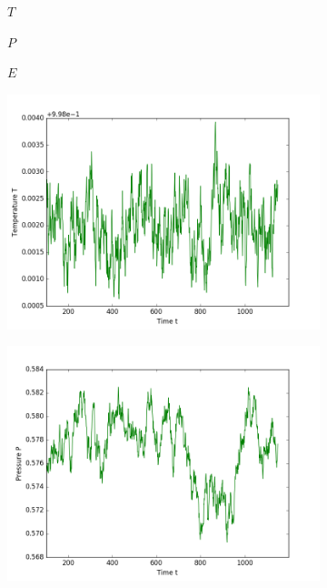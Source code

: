 \begin{figure}[ht]
\hfill
\begin{subfigure}{0.3\textwidth}
\centering
$T$
\end{subfigure}
\hfill
\begin{subfigure}{0.3\textwidth}
\centering
$P$
\end{subfigure}
\hfill
\begin{subfigure}{0.3\textwidth}
\centering
$E$
\end{subfigure}

\begin{subfigure}{0.3\textwidth}
\includegraphics[width=\textwidth]{fig/avTemperature_T1d0_F20d0_M100.png}
\end{subfigure}
\hfill
\begin{subfigure}{0.3\textwidth}
\includegraphics[width=\textwidth]{fig/avPressure_T1d0_F20d0_M100.png}

\end{subfigure}
\end{figure}
